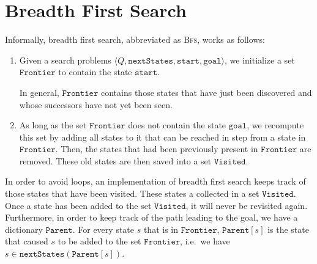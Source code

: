 \section{Breadth First Search}
Informally, breadth first search, abbreviated as \textsc{Bfs}, works as follows:
\begin{enumerate}
\item Given a search problems $\langle Q,\mathtt{nextStates}, \mathtt{start}, \mathtt{goal}\rangle$,  
      we initialize a set $\mathtt{Frontier}$ to contain the state $\mathtt{start}$.

      In general, $\mathtt{Frontier}$ contains those states that have just been discovered and whose successors have not
      yet been seen.
\item As long as the set $\mathtt{Frontier}$ does not contain the state $\mathtt{goal}$, we recompute this set 
      by adding all states to it that can be reached in step from a state in $\mathtt{Frontier}$.
      Then, the states that had been previously present in $\mathtt{Frontier}$ are removed.
      These old states are then saved into a set $\mathtt{Visited}$.
\end{enumerate}
In order to avoid loops, an implementation of breadth first search keeps track of those states that have
been visited.  These states a collected in a set $\mathtt{Visited}$.  Once a state has been added to
the set $\mathtt{Visited}$,  it will never be revisited again. 
Furthermore, in order to keep track of the path leading to the goal, we have a dictionary
$\mathtt{Parent}$.  For every state $s$ that is in $\mathtt{Frontier}$, $\mathtt{Parent}[s]$ is the state that
caused $s$ to be added to the set $\mathtt{Frontier}$, i.e.~we have
\\[0.2cm]
\hspace*{1.3cm}
$s \in \mathtt{nextStates}(\mathtt{Parent}[s])$.


